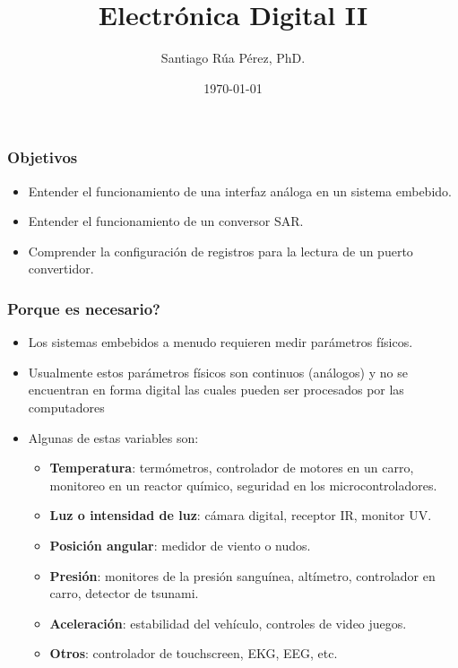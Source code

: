 \documentclass[10.5pt,scale=1.0,t,aspectratio=169,hyperref={pdfpagelabels=false}]{beamer}
\title{Electrónica Digital II}
\author{Santiago Rúa Pérez, PhD.}
\date{\today}
\begin{document}
	\begin{frame}
		\titlepage
	\end{frame}
	\frame{
		\begin{center}
			\LARGE \textcolor{blue}{INTERFAZ ANÁLOGA}
		\end{center}
		
	}
	

\begin{frame}
\frametitle{Objetivos}
\begin{itemize}
\item Entender el funcionamiento de una interfaz análoga en un sistema embebido. 
\item Entender el funcionamiento de un conversor SAR.
\item Comprender la configuración de registros para la lectura de un puerto convertidor. 
\end{itemize}
\end{frame}
\begin{frame}
	\frametitle{Porque es necesario?}
	\begin{itemize}
		\item Los sistemas embebidos a menudo requieren medir parámetros físicos.
		\item Usualmente estos parámetros físicos son continuos (análogos) y no se encuentran en forma digital las cuales pueden ser procesados por las computadores 
		\item Algunas de estas variables son:
		\begin{itemize}
			\item \textbf{Temperatura}: termómetros, controlador de motores en un carro, monitoreo en un reactor químico, seguridad en los microcontroladores. 
			\item \textbf{Luz o intensidad de luz}: cámara digital, receptor IR, monitor UV.
			\item \textbf{Posición angular}: medidor de viento o nudos. 
			\item \textbf{Presión}: monitores de la presión sanguínea, altímetro, controlador en carro, detector de tsunami. 
			\item \textbf{Aceleración}: estabilidad del vehículo, controles de video juegos. 
			\item \textbf{Otros}: controlador de touchscreen, EKG, EEG, etc. 
		\end{itemize}
	\end{itemize}
\end{frame}
\end{document}
